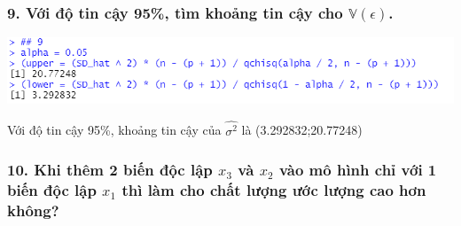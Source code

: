 \documentclass[a4paper]{article}
\theoremstyle{nonumberplain}
\begin{document}
\subsubsection*{9. Với độ tin cậy 95\%, tìm khoảng tin cậy cho $\mathbb{V}(\epsilon)$. }

\begin{center}
\includegraphics{bai3_9.PNG} 
\end{center}

Với độ tin cậy 95\%, khoảng tin cậy của $\hat{\sigma^2}$ là (3.292832;20.77248)

\subsubsection*{10. Khi thêm 2 biến độc lập $x_3$ và $x_2$ vào mô hình chỉ với 1 biến độc lập $x_1$ thì làm cho chất lượng ước lượng cao hơn không?}
\end{document}
